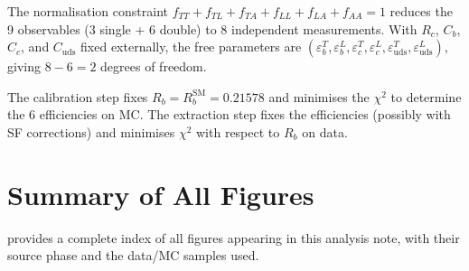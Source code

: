 \documentclass[11pt,a4paper]{article}
\begin{document}
The normalisation constraint
$f_{TT} + f_{TL} + f_{TA} + f_{LL} + f_{LA} + f_{AA} = 1$
reduces the 9 observables ($3$ single + $6$ double) to 8
independent measurements.
With $R_c$, $C_b$, $C_c$, and $C_\text{uds}$ fixed externally,
the free parameters are
$(\varepsilon_b^T, \varepsilon_b^L, \varepsilon_c^T,
\varepsilon_c^L, \varepsilon_\text{uds}^T,
\varepsilon_\text{uds}^L)$, giving $8 - 6 = 2$ degrees of freedom.

The calibration step fixes $R_b = R_b^\text{SM} = 0.21578$ and
minimises the $\chi^2$ to determine the 6 efficiencies on MC.
The extraction step fixes the efficiencies (possibly with
SF corrections) and minimises $\chi^2$ with respect to $R_b$
on data.

\section{Summary of All Figures}
\label{app:figure_summary}

 provides a complete index of all
figures appearing in this analysis note, with their source phase
and the data/MC samples used.
\end{document}
